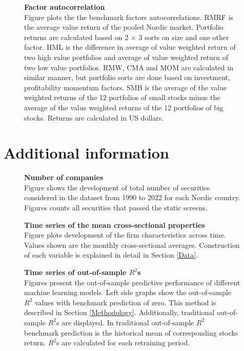 \documentclass{article}
\begin{document}
\begin{figure}[ht]
\centering
\caption[Factor autocorrelation]{\textbf{Factor autocorrelation}\\ Figure plots the the benchmark factors autocorrelations. RMRF is the average value return of the pooled Nordic market. Portfolio returns are calculated based on 2 × 3 sorts on size and one other factor. HML is the difference in average of value weighted return of two high value portfolios and average of value weighted return of two low value portfolios. RMW, CMA and MOM are calculated in similar manner, but portfolio sorts are done based on investment, profitability momentum factors. SMB is the average of the value weighted returns of the 12 portfolios of small stocks minus the average of the value weighted returns of the 12 portfolios of big stocks. Returns are calculated in US dollars.}

\label{plot:factor_autocorrelation}
\end{figure}

\clearpage

\section{Additional information}
\renewcommand{\thefigure}{C.\arabic{figure}}
\setcounter{figure}{0}
\renewcommand{\thetable}{C.\arabic{table}}
\setcounter{table}{0}

\begin{figure}[ht]
\centering
\caption[Number of companies]{\textbf{Number of companies}\\ Figure shows the development of total number of securities considered in the dataset from 1990 to 2022 for each Nordic country. Figures counts all securities that passed the static screens.}

\label{plot:number_of_companies}
\end{figure}

\begin{figure}[ht]
\centering
\caption[Time series of the mean cross-sectional properties]{\textbf{Time series of the mean cross-sectional properties}\\ Figure plots development of the firm characteristics across time. Values shown are the monthly cross-sectional averages. Construction of each variable is explained in detail in Section \ref{Data}.}

\label{plot:variableTS}
\end{figure}

\begin{figure}[ht]
\centering
\caption[Time series of out-of-sample $R^2$]{\textbf{Time series of out-of-sample \boldmath$R^2$s}\\ Figures present the out-of-sample predictive performance of different machine learning models. Left side graphs show the out-of-sample $R^2$ values with benchmark prediction of zero. This method is described in Section \ref{Methodology}. Additionally, traditional out-of-sample $R^2$s are displayed. In traditional out-of-sample $R^2$ benchmark prediction is the historical mean of corresponding stocks return. $R^2$s are calculated for each retraining period.}

\label{plot:OOSR2_ts}
\end{figure}
\end{document}
